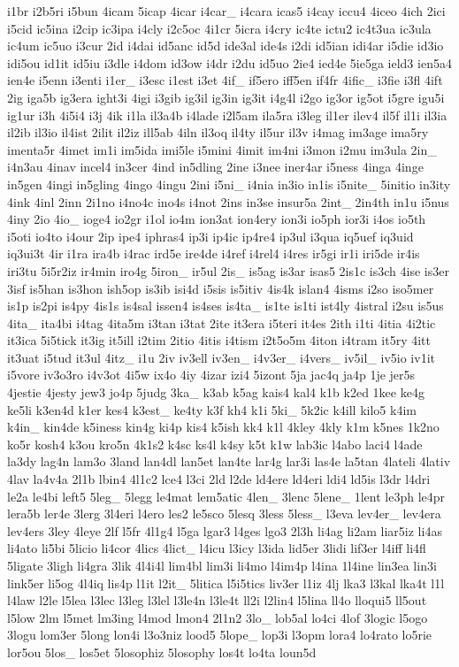 \begin{DoxyCompactItemize}
i1br i2b5ri i5bun 4icam 5icap 4icar i4car\-\_\- i4cara icas5 i4cay iccu4 4iceo 4ich 2ici i5cid ic5ina i2cip ic3ipa i4cly i2c5oc 4i1cr 5icra i4cry ic4te ictu2 ic4t3ua ic3ula ic4um ic5uo i3cur 2id i4dai id5anc id5d ide3al ide4s i2di id5ian idi4ar i5die id3io idi5ou id1it id5iu i3dle i4dom id3ow i4dr i2du id5uo 2ie4 ied4e 5ie5ga ield3 ien5a4 ien4e i5enn i3enti i1er\-\_\- i3esc i1est i3et 4if\-\_\- if5ero iff5en if4fr 4ific\-\_\- i3fie i3fl 4ift 2ig iga5b ig3era ight3i 4igi i3gib ig3il ig3in ig3it i4g4l i2go ig3or ig5ot i5gre igu5i ig1ur i3h 4i5i4 i3j 4ik i1la il3a4b i4lade i2l5am ila5ra i3leg il1er ilev4 il5f il1i il3ia il2ib il3io il4ist 2ilit il2iz ill5ab 4iln il3oq il4ty il5ur il3v i4mag im3age ima5ry imenta5r 4imet im1i im5ida imi5le i5mini 4imit im4ni i3mon i2mu im3ula 2in\-\_\- i4n3au 4inav incel4 in3cer 4ind in5dling 2ine i3nee iner4ar i5ness 4inga 4inge in5gen 4ingi in5gling 4ingo 4ingu 2ini i5ni\-\_\- i4nia in3io in1is i5nite\-\_\- 5initio in3ity 4ink 4inl 2inn 2i1no i4no4c ino4s i4not 2ins in3se insur5a 2int\-\_\- 2in4th in1u i5nus 4iny 2io 4io\-\_\- ioge4 io2gr i1ol io4m ion3at ion4ery ion3i io5ph ior3i i4os io5th i5oti io4to i4our 2ip ipe4 iphras4 ip3i ip4ic ip4re4 ip3ul i3qua iq5uef iq3uid iq3ui3t 4ir i1ra ira4b i4rac ird5e ire4de i4ref i4rel4 i4res ir5gi ir1i iri5de ir4is iri3tu 5i5r2iz ir4min iro4g 5iron\-\_\- ir5ul 2is\-\_\- is5ag is3ar isas5 2is1c is3ch 4ise is3er 3isf is5han is3hon ish5op is3ib isi4d i5sis is5itiv 4is4k islan4 4isms i2so iso5mer is1p is2pi is4py 4is1s is4sal issen4 is4ses is4ta\-\_\- is1te is1ti ist4ly 4istral i2su is5us 4ita\-\_\- ita4bi i4tag 4ita5m i3tan i3tat 2ite it3era i5teri it4es 2ith i1ti 4itia 4i2tic it3ica 5i5tick it3ig it5ill i2tim 2itio 4itis i4tism i2t5o5m 4iton i4tram it5ry 4itt it3uat i5tud it3ul 4itz\-\_\- i1u 2iv iv3ell iv3en\-\_\- i4v3er\-\_\- i4vers\-\_\- iv5il\-\_\- iv5io iv1it i5vore iv3o3ro i4v3ot 4i5w ix4o 4iy 4izar izi4 5izont 5ja jac4q ja4p 1je jer5s 4jestie 4jesty jew3 jo4p 5judg 3ka\-\_\- k3ab k5ag kais4 kal4 k1b k2ed 1kee ke4g ke5li k3en4d k1er kes4 k3est\-\_\- ke4ty k3f kh4 k1i 5ki\-\_\- 5k2ic k4ill kilo5 k4im k4in\-\_\- kin4de k5iness kin4g ki4p kis4 k5ish kk4 k1l 4kley 4kly k1m k5nes 1k2no ko5r kosh4 k3ou kro5n 4k1s2 k4sc ks4l k4sy k5t k1w lab3ic l4abo laci4 l4ade la3dy lag4n lam3o 3land lan4dl lan5et lan4te lar4g lar3i las4e la5tan 4lateli 4lativ 4lav la4v4a 2l1b lbin4 4l1c2 lce4 l3ci 2ld l2de ld4ere ld4eri ldi4 ld5is l3dr l4dri le2a le4bi left5 5leg\-\_\- 5legg le4mat lem5atic 4len\-\_\- 3lenc 5lene\-\_\- 1lent le3ph le4pr lera5b ler4e 3lerg 3l4eri l4ero les2 le5sco 5lesq 3less 5less\-\_\- l3eva lev4er\-\_\- lev4era lev4ers 3ley 4leye 2lf l5fr 4l1g4 l5ga lgar3 l4ges lgo3 2l3h li4ag li2am liar5iz li4as li4ato li5bi 5licio li4cor 4lics 4lict\-\_\- l4icu l3icy l3ida lid5er 3lidi lif3er l4iff li4fl 5ligate 3ligh li4gra 3lik 4l4i4l lim4bl lim3i li4mo l4im4p l4ina 1l4ine lin3ea lin3i link5er li5og 4l4iq lis4p l1it l2it\-\_\- 5litica l5i5tics liv3er l1iz 4lj lka3 l3kal lka4t l1l l4law l2le l5lea l3lec l3leg l3lel l3le4n l3le4t ll2i l2lin4 l5lina ll4o lloqui5 ll5out l5low 2lm l5met lm3ing l4mod lmon4 2l1n2 3lo\-\_\- lob5al lo4ci 4lof 3logic l5ogo 3logu lom3er 5long lon4i l3o3niz lood5 5lope\-\_\- lop3i l3opm lora4 lo4rato lo5rie lor5ou 5los\-\_\- los5et 5losophiz 5losophy los4t lo4ta loun5d 
\end{DoxyCompactItemize}
